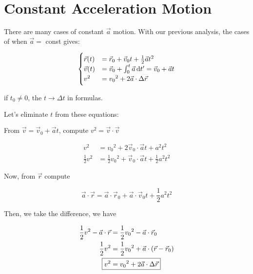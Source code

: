 \section{Constant Acceleration Motion}

\begin{theorem}
	There are many cases of constant $\vec a$ motion. With our previous analysis, the cases of when $\vec a =$ const gives:

	\begin{equation}
		\begin{cases}
			\vec r(t) &= \vec r_0 + \vec v_0 t + \frac{1}{2} \vec a t^2\\
			\vec v(t) &= \vec v_0 + \int_0^t \vec a \D t' = \vec v_0 + \vec a t\\
			v^2 &= {v_0}^2 + 2 \vec a \cdot \Delta \vec r
		\end{cases}
	\end{equation}
\end{theorem}

\begin{remark}
	if $t_0 \neq 0$, the $t \to \Delta t$ in formulas.
\end{remark}

Let's eliminate $t$ from these equations:

From $\vec v = \vec v_0 + \vec a t$, compute $v^2 = \vec v \cdot \vec v$

\begin{align}
	v^2 &= {v_0}^2 + 2 \vec v_0 \cdot \vec a t + a^2t^2\\
	\frac{1}{2} v^2 &= \frac{1}{2} {v_0}^2 + \vec v_0 \cdot \vec a t + \frac{1}{2}a^2t^2
\end{align}

Now, from $\vec r$ compute

\begin{equation}
	\vec a \cdot \vec r = \vec a \cdot \vec r_0 + \vec a \cdot \vec v_0 t + \frac{1}{2} a^2 t^2
\end{equation}

Then, we take the difference, we have

\begin{align}
	\frac{1}{2} v^2 - \vec a \cdot \vec r &= \frac{1}{2} {v_0}^2 - \vec a \cdot \vec r_0\\
	\frac{1}{2} v^2 &= \frac{1}{2} {v_0}^2 + \vec a \cdot (\vec r - \vec r_0)\\
	\Aboxed{v^2 &= {v_0}^2 + 2 \vec a \cdot \Delta \vec r}
\end{align}

